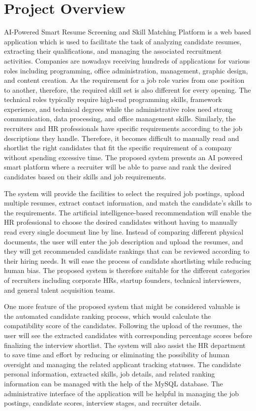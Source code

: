 \documentclass[12pt,a4paper]{report}
\begin{document}
\section{Project Overview}
AI-Powered Smart Resume Screening and Skill Matching Platform is a web based application which is used to facilitate the task of analyzing candidate resumes, extracting their qualifications, and managing the associated recruitment activities. Companies are nowadays receiving hundreds of applications for various roles including programming, office administration, management, graphic design, and content creation. As the requirement for a job role varies from one position to another, therefore, the required skill set is also different for every opening. The technical roles typically require high-end programming skills, framework experience, and technical degrees while the administrative roles need strong communication, data processing, and office management skills. Similarly, the recruiters and HR professionals have specific requirements according to the job descriptions they handle. Therefore, it becomes difficult to manually read and shortlist the right candidates that fit the specific requirement of a company without spending excessive time. The proposed system presents an AI powered smart platform where a recruiter will be able to parse and rank the desired candidates based on their skills and job requirements.

The system will provide the facilities to select the required job postings, upload multiple resumes, extract contact information, and match the candidate's skills to the requirements. The artificial intelligence-based recommendation will enable the HR professional to choose the desired candidates without having to manually read every single document line by line. Instead of comparing different physical documents, the user will enter the job description and upload the resumes, and they will get recommended candidate rankings that can be reviewed according to their hiring needs. It will ease the process of candidate shortlisting while reducing human bias. The proposed system is therefore suitable for the different categories of recruiters including corporate HRs, startup founders, technical interviewers, and general talent acquisition teams.

One more feature of the proposed system that might be considered valuable is the automated candidate ranking process, which would calculate the compatibility score of the candidates. Following the upload of the resumes, the user will see the extracted candidates with corresponding percentage scores before finalizing the interview shortlist. The system will also assist the HR department to save time and effort by reducing or eliminating the possibility of human oversight and managing the related applicant tracking statuses. The candidate personal information, extracted skills, job details, and related ranking information can be managed with the help of the MySQL database. The administrative interface of the application will be helpful in managing the job postings, candidate scores, interview stages, and recruiter details.
\end{document}
